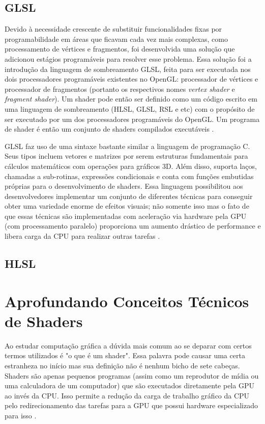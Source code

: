 \subsection{GLSL}
\label{sec:glsl}

Devido à necessidade crescente de substituir funcionalidades fixas por programabilidade em áreas que ficavam cada vez mais complexas, como processamento de vértices e fragmentos, foi desenvolvida uma solução que adicionou estágios programáveis para resolver esse problema. Essa solução foi a introdução da linguagem de sombreamento \acrshort{GLSL}, feita para ser executada nos dois processadores programáveis existentes no OpenGL: processador de vértices e processador de fragmentos (portanto os respectivos nomes \textit{vertex shader} e \textit{fragment shader}). Um shader pode então ser definido como um código escrito em uma linguagem de sombreamento (HLSL, GLSL, RSL e etc) com o propósito de ser executado por um dos processadores programáveis do OpenGL. Um programa de shader é então um conjunto de shaders compilados executáveis \cite{GLSLBook}.

GLSL faz uso de uma sintaxe bastante similar a linguagem de programação C. Seus tipos incluem vetores e matrizes por serem estruturas fundamentais para cálculos matemáticos com operações para gráficos 3D. Além disso, suporta laços, chamadas a sub-rotinas, expressões condicionais e conta com funções embutidas próprias para o desenvolvimento de shaders. Essa linguagem possibilitou aos desenvolvedores implementar um conjunto de diferentes técnicas para conseguir obter uma variedade enorme de efeitos visuais; não somente isso mas o fato de que essas técnicas são implementadas com aceleração via hardware pela GPU (com processamento paralelo) proporciona um aumento drástico de performance e libera carga da CPU para realizar outras tarefas \cite{GLSLBook}.

\subsection{HLSL}
\label{sec:hlsl}


\section{Aprofundando Conceitos Técnicos de Shaders}
\label{sec:aprofundando-conceitos-tecnicos-shaders}

Ao estudar computação gráfica a dúvida mais comum ao se deparar com certos termos utilizados é "o que é um shader". Essa palavra pode causar uma certa estranheza no início mas sua definição não é nenhum bicho de sete cabeças. Shaders são apenas pequenos programas (assim como um reprodutor de mídia ou uma calculadora de um computador) que são executados diretamente pela \acrshort{GPU} ao invés da \acrshort{CPU}. Isso permite a redução da carga de trabalho gráfico da \acrshort{CPU} pelo redirecionamento das tarefas para a \acrshort{GPU} que possui hardware especializado para isso \cite{openGLBook}.

